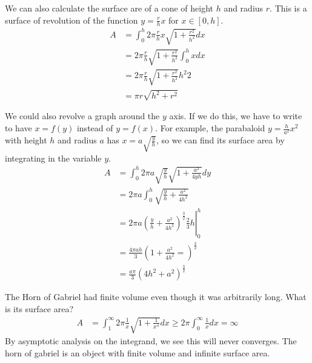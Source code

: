 \documentclass[fleqn]{report}
\begin{document}
\begin{example}
We can also calculate the surface are of a cone of height $h$
and radius $r$. This is a surface of revolution of the
function $y = \frac{r}{h} x$ for $x \in [0, h]$. 
\begin{align*}
A & = \int_0^h 2\pi \frac{r}{h} x \sqrt{ 1 + \frac{r^2}{h^2}} dx
\\
& = 2\pi \frac{r}{h} \sqrt{1 + \frac{r^2}{h^2}} \int_0^h x dx \\
& = 2\pi \frac{r}{h} \sqrt{1 + \frac{r^2}{h^2}} {h^2}{2} \\
& = \pi r \sqrt{h^2 + r^2} 
\end{align*}
\end{example}


\begin{example}
We could also revolve a graph around the $y$ axis.
If we do this, we have to write to have $x = f(y)$ instead of $y = f(x)$.
For example, the parabaloid $y = \frac{h}{a^2} x^2$ with height
$h$ and radius $a$ has $x = a \sqrt{\frac{y}{h}}$, so we can
find its surface area by integrating in the variable $y$.
\begin{align*}
A & = \int_0^h 2\pi a \sqrt{\frac{y}{h}} \sqrt{ 1 +
\frac{a^2}{4yh}} dy \\
& = 2\pi a \int_0^h \sqrt{ \frac{y}{h} + \frac{a^2}{4h^2}} \\
& = \left. 2\pi a \left(\frac{y}{h} + \frac{a^2}{4h^2}
\right)^{\frac{3}{2}} \frac{2}{3} h \right|_0^h \\
& = \frac{4\pi ah}{3} \left(1 + \frac{a^2}{4h^2} =
\right)^{\frac{3}{2}} \\
& = \frac{a\pi}{3} \left( 4h^2 + a^2 \right)^{\frac{3}{2}}
\end{align*}
\end{example}

\begin{example}
The Horn of Gabriel had finite volume even though it was
arbitrarily long. What is its surface area?
\begin{align*}
A & = \int_1^\infty 2\pi \frac{1}{x} \sqrt{ 1 + \frac{1}{x^4}}
dx \geq 2 \pi \int_0^\infty \frac{1}{x} dx = \infty 
\end{align*}
By asymptotic analysis on the integrand, we see this will
never converges. The horn of gabriel is an object with finite
volume and infinite surface area.
\end{example}
\end{document}
